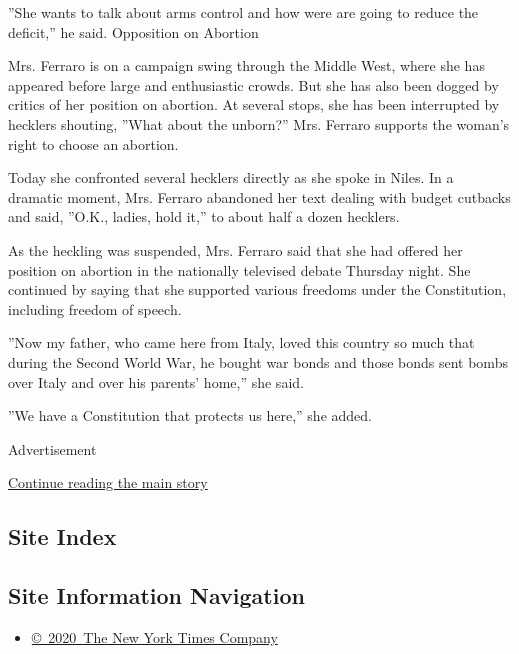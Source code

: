 ''She wants to talk about arms control and how were are going to reduce
the deficit,'' he said. Opposition on Abortion

Mrs. Ferraro is on a campaign swing through the Middle West, where she
has appeared before large and enthusiastic crowds. But she has also been
dogged by critics of her position on abortion. At several stops, she has
been interrupted by hecklers shouting, ''What about the unborn?'' Mrs.
Ferraro supports the woman's right to choose an abortion.

Today she confronted several hecklers directly as she spoke in Niles. In
a dramatic moment, Mrs. Ferraro abandoned her text dealing with budget
cutbacks and said, ''O.K., ladies, hold it,'' to about half a dozen
hecklers.

As the heckling was suspended, Mrs. Ferraro said that she had offered
her position on abortion in the nationally televised debate Thursday
night. She continued by saying that she supported various freedoms under
the Constitution, including freedom of speech.

''Now my father, who came here from Italy, loved this country so much
that during the Second World War, he bought war bonds and those bonds
sent bombs over Italy and over his parents' home,'' she said.

''We have a Constitution that protects us here,'' she added.

Advertisement

\protect\hyperlink{after-bottom}{Continue reading the main story}

\hypertarget{site-index}{%
\subsection{Site Index}\label{site-index}}

\hypertarget{site-information-navigation}{%
\subsection{Site Information
Navigation}\label{site-information-navigation}}

\begin{itemize}
\tightlist
\item
  \href{https://help.nytimes.com/hc/en-us/articles/115014792127-Copyright-notice}{©~2020~The
  New York Times Company}
\end{itemize}

